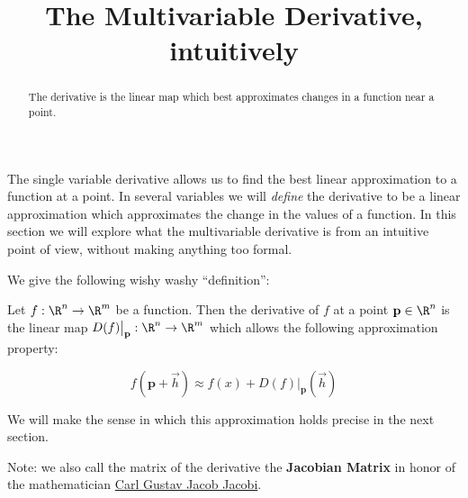 \documentclass{ximera}
\title{ The Multivariable Derivative, intuitively}
\begin{document}
\begin{abstract}
	The derivative is the linear map which best approximates changes in a function near a point.
\end{abstract}

The single variable derivative allows us to find the best linear approximation to a function at a point.  In several variables we will \textit{define} 
the derivative to be a linear approximation which approximates the change in the values of a function.   
In this section we will explore what the multivariable derivative is from an intuitive point of view, without making anything too formal.

We give the following wishy washy ``definition'':

\begin{definition}
	Let $f:\R^n \to \R^m$ be a function.  Then the derivative of $f$ at a point $\mathbf{p} \in \R^n$ is the linear map $D(f)\big|_{\mathbf{p}}:\R^n \to \R^m$ 
	which allows the following approximation property:
	
	\[
		f(\mathbf{p} + \vec{h}) \approx f(x) + D(f)\big|_{\mathbf{p}}(\vec{h})
	\]
	
	We will make the sense in which this approximation holds precise in the next section.
\end{definition}

Note:  we also call the matrix of the derivative the \textbf{Jacobian Matrix} in honor of the mathematician 
\href{http://en.wikipedia.org/wiki/Carl_Gustav_Jacob_Jacobi}{Carl Gustav Jacob Jacobi}.
\end{document}
